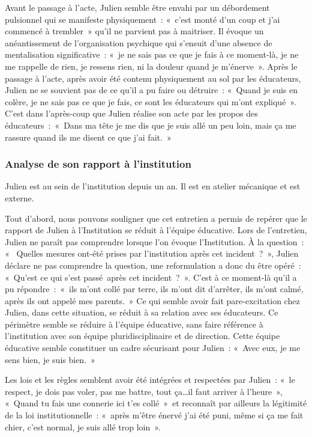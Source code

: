 \documentclass[12pt, a4paper]{book}
\begin{document}
\begin{spacing}{1.5}
Avant le passage à l'acte, Julien semble être envahi par un débordement pulsionnel qui se manifeste physiquement : « c'est monté d'un coup et j'ai commencé à trembler » qu'il ne parvient pas à maitriser. Il évoque un anéantissement de l'organisation psychique qui s'ensuit d'une absence de mentalisation significative : « je ne sais pas ce que je fais à ce moment-là, je ne me rappelle de rien, je ressens rien, ni la douleur quand je m'énerve ». Après le passage à l'acte, après avoir été contenu physiquement au sol par les éducateurs, Julien ne se souvient pas de ce qu'il a pu faire ou détruire : « Quand je suis en colère, je ne sais pas ce que je fais, ce sont les éducateurs qui m'ont expliqué ». C'est dans l'après-coup que Julien réalise son acte par les propos des éducateurs : « Dans ma tête je me dis que je suis allé un peu loin, mais ça me rassure quand ils me disent ce que j'ai fait. »

\subsubsection{Analyse de son rapport à l'institution}

Julien est au sein de l'institution depuis un an. Il est en atelier mécanique et est  externe.

Tout d'abord, nous pouvons souligner que cet entretien a permis de repérer que le rapport de Julien à l'Institution se réduit à l'équipe éducative. Lors de l'entretien, Julien ne paraît pas comprendre lorsque l'on évoque l'Institution. À la question : «  Quelles mesures ont-été prises par l'institution après cet incident ? », Julien déclare ne pas comprendre la question, une reformulation a donc du être opéré : « Qu'est ce qui s'est passé après cet incident ? ». C'est à ce moment-là qu'il a pu répondre : « ils m'ont collé par terre, ils m'ont dit d'arrêter, ils m'ont calmé, après ils ont appelé mes parents. » Ce qui semble avoir fait pare-excitation chez Julien, dans cette situation, se réduit à sa relation avec ses éducateurs. Ce périmètre semble se réduire à l'équipe éducative, sans faire référence à l'institution avec son équipe pluridisciplinaire et de direction. Cette équipe éducative semble constituer un cadre sécurisant pour Julien : « Avec eux, je me sens bien, je suis bien. »

Les lois et les règles semblent avoir été intégrées et respectées par Julien : « le respect, je dois pas voler, pas me battre, tout ça…il faut arriver à l'heure », « Quand tu fais une connerie ici t'es collé » et reconnaît par ailleurs la légitimité de la loi institutionnelle : « après m'être énervé j'ai été puni, même si ça me fait chier, c'est normal, je suis allé trop loin ».


\end{spacing}
\end{document}
